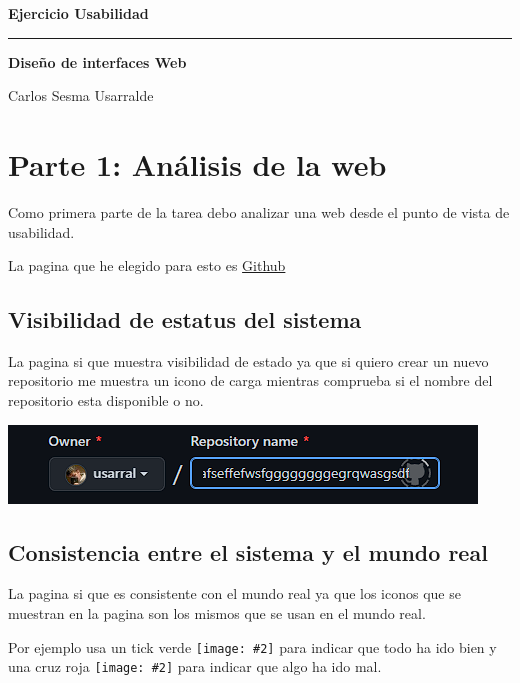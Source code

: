 \documentclass[a4paper,12pt]{article} %
\newcommand{\image}[2][1]{\texttt{[image: \#2]}}
\newcommand{\Nombre}{Carlos Sesma Usarralde}
\newcommand{\Proyecto}{Ejercicio Usabilidad}
\begin{document}
\cfoot{\thepage}
\begin{titlepage}
    \begin{center}
        \huge\textbf{\Proyecto}
    \end{center}
    \hfill{}
    {\color{accentColor}\hrule}
    \vfill{}
    \begin{center}
        \huge\textbf{Diseño de interfaces Web}
    \end{center}
    \vfill{}
    \begin{center}
        {\large{} \Nombre}
    \end{center}
\end{titlepage}
\clearpage{}
\tableofcontents{}
\thispagestyle{empty}
\clearpage{}
\section{Parte 1:   Análisis de la web}
Como primera parte de la tarea debo analizar una web desde el punto de vista de usabilidad.

La pagina que he elegido para esto es \href{https://github.com}{Github}

\subsection{Visibilidad de estatus del sistema}
La pagina si que muestra visibilidad de estado ya que si quiero crear un nuevo repositorio me muestra un icono de carga mientras comprueba si el nombre del repositorio esta disponible o no.

\includegraphics{01.png}

\subsection{Consistencia entre el sistema y el mundo real}

La pagina si que es consistente con el mundo real ya que los iconos que se muestran en la pagina son los mismos que se usan en el mundo real.

Por ejemplo usa un tick verde \image[0.05]{emoji/u2705.png} para indicar que todo ha ido bien y una cruz roja \image[0.05]{emoji/u274c.png} para indicar que algo ha ido mal.
\end{document}
